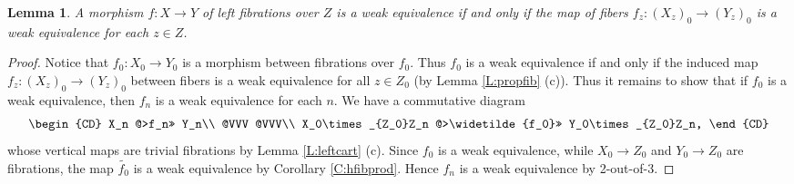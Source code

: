 \documentclass[12pt]{amsart}
\theoremstyle{plain}
\newtheorem{Lem}[Thm]{Lemma}
\theoremstyle{definition}
\numberwithin{equation}{section}
\newcommand{\wt}{\widetilde}
\newcommand{\rl}[1]{Lemma \ref{L:#1}}
\newcommand{\rco}[1]{Corollary \ref{C:#1}}
\newcommand{\Id}{\operatorname{Id}}
\begin{document}


\begin{Lem} \label{L:leftequiv}
A morphism $f:X\to Y$ of left fibrations over $Z$ is a weak
equivalence if and only if the map of fibers $f_z:(X_z)_0\to
(Y_z)_0$ is a weak equivalence  for each $z\in Z$.
\end{Lem}

\begin{proof}
Notice that $f_0:X_0\to Y_0$ is a morphism between fibrations over
$f_0$. Thus $f_0$ is a weak equivalence if and only if the induced
map $f_z:(X_z)_0\to (Y_z)_0$ between fibers is a weak equivalence
for all $z\in Z_0$ (by \rl{propfib} (c)). Thus it remains to show
that if $f_0$ is a weak equivalence, then $f_n$ is a weak
equivalence for each $n$. We have a commutative diagram
%
\[
\begin{CD}
X_n @>f_n>> Y_n\\
@VVV @VVV\\
X_0\times_{Z_0}Z_n  @>\wt{f_0}>> Y_0\times_{Z_0}Z_n,
\end{CD}
\]
%
whose vertical maps are trivial fibrations by \rl{leftcart} (c).
Since $f_0$ is a weak equivalence, while $X_0\to Z_0$ and $Y_0\to
Z_0$ are fibrations, the map $\wt{f_0}$ is a weak equivalence by
\rco{hfibprod}. Hence $f_n$ is a weak equivalence by  2-out-of-3.
\end{proof}
\end{document}
